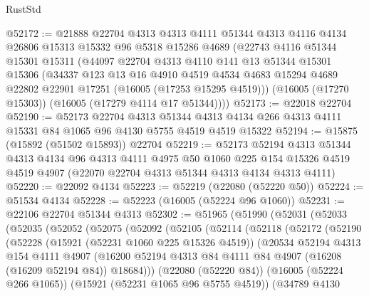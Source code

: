 \begin{lexlean}{RustStd}
\begin{coremodule}
@52172 := @21888
    @22704
    @4313
    @4313
    @4111
    @51344
    @4313
    @4116
    @4134
    @26806
    @15313
    @15332
    @96
    @5318
    @15286
    @4689
    (@22743
      @4116
      @51344
      @15301
      @15311
      (@44097
        @22704
        @4313
        @4110
        @141
        @13
        @51344
        @15301
        @15306
        (@34337
          @123
          @13
          @16
          @4910
          @4519
          @4534
          @4683
          @15294
          @4689
          @22802
          @22901
          @17251
          (@16005 (@17253 @15295 @4519)))
        (@16005 (@17270 @15303))
        (@16005 (@17279 @4114 @17 @51344))))
@52173 := @22018 @22704
@52190 := @52173
    @22704
    @4313
    @51344
    @4313
    @4134
    @266
    @4313
    @4111
    @15331
    @84
    @1065
    @96
    @4130
    @5755
    @4519
    @4519
    @15322
@52194 := @15875 (@15892 (@51502 @15893)) @22704
@52219 := @52173
    @52194
    @4313
    @51344
    @4313
    @4134
    @96
    @4313
    @4111
    @4975
    @50
    @1060
    @225
    @154
    @15326
    @4519
    @4519
    @4907
    (@22070 @22704 @4313 @51344 @4313 @4134 @4313 @4111)
@52220 := @22092 @4134
@52223 := @52219 (@22080 (@52220 @50))
@52224 := @51534 @4134
@52228 := @52223 (@16005 (@52224 @96 @1060))
@52231 := @22106 @22704 @51344 @4313
@52302 := @51965
    (@51990
      (@52031
        (@52033
          (@52035
            (@52052
              (@52075
                (@52092
                  (@52105
                    (@52114
                      (@52118
                        (@52172
                          (@52190
                            (@52228
                              (@15921 (@52231 @1060 @225 @15326 @4519))
                              (@20534
                                @52194
                                @4313
                                @154
                                @4111
                                @4907
                                (@16200
                                  @52194
                                  @4313
                                  @84
                                  @4111
                                  @84
                                  @4907
                                  (@16208 (@16209 @52194 @84))
                                  @18684)))
                            (@22080 (@52220 @84))
                            (@16005 (@52224 @266 @1065))
                            (@15921 (@52231 @1065 @96 @5755 @4519))
                            (@34789
                              @4130

\end{coremodule}
\end{lexlean}
